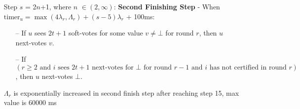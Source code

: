 \documentclass{article}
\begin{document}
\begin{enumerate}
        \item[] Step $s$ = 2$n$+1, where $n$ $\in (2, \infty)$: \textbf{Second Finishing Step} - When $\text{timer}_u = \max(4\lambda_r, \Lambda_r) + (s-5)\lambda_r$ + 100ms:
        \begin{itemize}
            \item[--] If $u$ sees $2t+1$ soft-votes for some value $v \neq \bot$ for round $r$, then $u$ next-votes $v$.
            \item[--] If $(r \geq 2 \text{ and } i \text{ sees } 2t+1 \text{ next-votes for } \bot \text{ for round } r-1 \text{ and } i \text{ has not certified in round } r)$, then $u$ next-votes $\bot$.
        \end{itemize}
        $\Lambda_r$ is exponentially increased in second finish step after reaching step 15, max value is 60000 ms

    \end{enumerate}
\end{document}
